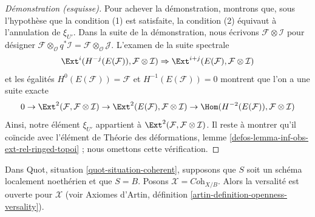 \begin{proof}[Démonstration (esquisse)]
\medskip\noindent
Pour achever la démonstration, montrons que, sous l'hypothèse que la condition
(1) est satisfaite, la condition (2) équivaut à l'annulation de $\xi_{U'}$.
Dans la suite de la démonstration, nous écrivons
$\mathcal{F} \otimes \mathcal{I}$ pour désigner
$\mathcal{F} \otimes_\mathcal{O} q^*\mathcal{I} =
\mathcal{F} \otimes_\mathcal{O} \mathcal{J}$. L'examen de la suite spectrale
$$
\Ext^i(H^{-j}(E(\mathcal{F})), \mathcal{F} \otimes \mathcal{I})
\Rightarrow
\Ext^{i + j}(E(\mathcal{F}), \mathcal{F} \otimes \mathcal{I})
$$
et les égalités $H^0(E(\mathcal{F})) = \mathcal{F}$ et
$H^{-1}(E(\mathcal{F})) = 0$ montrent que l'on a une suite exacte
$$
0 \to
\Ext^2(\mathcal{F}, \mathcal{F} \otimes \mathcal{I}) \to
\Ext^2(E(\mathcal{F}), \mathcal{F} \otimes \mathcal{I}) \to
\Hom(H^{-2}(E(\mathcal{F})), \mathcal{F} \otimes \mathcal{I})
$$
Ainsi, notre élément $\xi_{U'}$ appartient à
$\Ext^2(\mathcal{F}, \mathcal{F} \otimes \mathcal{I})$.
Il reste à montrer qu'il coïncide avec l'élément de
Théorie des déformations, lemme \ref{defos-lemma-inf-obs-ext-rel-ringed-topoi} ;
nous omettons cette vérification.
\end{proof}

\begin{lemma}
\label{lemma-coherent-defo-thy-general}
Dans Quot, situation \ref{quot-situation-coherent}, supposons que $S$ soit un
schéma localement noethérien et que $S = B$. Posons
$\mathcal{X} = \textit{Coh}_{X/B}$. Alors la versalité est ouverte pour
$\mathcal{X}$ (voir Axiomes d'Artin, définition
\ref{artin-definition-openness-versality}).
\end{lemma}

